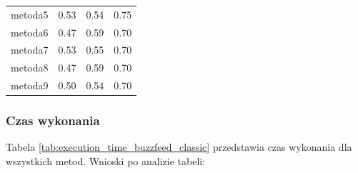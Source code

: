 \begin{table}[H]
\begin{tabular}{lccc}
		metoda5           & 0.53          & 0.54             & 0.75           \\
		metoda6           & 0.47          & 0.59             & 0.70           \\
		metoda7           & 0.53          & 0.55             & 0.70           \\
		metoda8           & 0.47          & 0.59             & 0.70           \\
		metoda9           & 0.50          & 0.54             & 0.70           \\
		\bottomrule
	\end{tabular}
\end{table}

\subsubsection{Czas wykonania}
Tabela \ref{tab:execution_time_buzzfeed_classic} przedstawia czas wykonania dla wszystkich metod. Wnioski po analizie tabeli:


